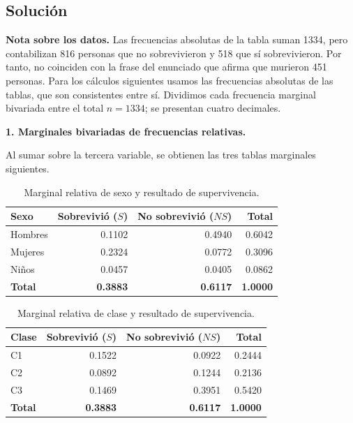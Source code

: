 \documentclass[12pt]{article}
\begin{document}
\subsection*{Solución}

\textbf{Nota sobre los datos.} Las frecuencias absolutas de la tabla suman 1334, pero contabilizan 816 personas que no sobrevivieron y 518 que sí sobrevivieron. Por tanto, no coinciden con la frase del enunciado que afirma que murieron 451 personas. Para los cálculos siguientes usamos las frecuencias absolutas de las tablas, que son consistentes entre sí. Dividimos cada frecuencia marginal bivariada entre el total $n=1334$; se presentan cuatro decimales.

\textbf{1. Marginales bivariadas de frecuencias relativas.}

Al sumar sobre la tercera variable, se obtienen las tres tablas marginales siguientes.

\begin{table}[H]
\centering
\small
\renewcommand{\arraystretch}{1.15}
\begin{tabular}{|l|r|r|r|}
\hline
\textbf{Sexo} & \textbf{Sobrevivió ($S$)} & \textbf{No sobrevivió ($NS$)} & \textbf{Total} \\ \hline
Hombres & 0.1102 & 0.4940 & 0.6042 \\ \hline
Mujeres & 0.2324 & 0.0772 & 0.3096 \\ \hline
Niños & 0.0457 & 0.0405 & 0.0862 \\ \hline
\textbf{Total} & \textbf{0.3883} & \textbf{0.6117} & \textbf{1.0000} \\ \hline
\end{tabular}
\caption{Marginal relativa de sexo y resultado de supervivencia.}
\label{tab:titanic-marginal-sexo-supervivencia}
\end{table}

\begin{table}[H]
\centering
\small
\renewcommand{\arraystretch}{1.15}
\begin{tabular}{|l|r|r|r|}
\hline
\textbf{Clase} & \textbf{Sobrevivió ($S$)} & \textbf{No sobrevivió ($NS$)} & \textbf{Total} \\ \hline
C1 & 0.1522 & 0.0922 & 0.2444 \\ \hline
C2 & 0.0892 & 0.1244 & 0.2136 \\ \hline
C3 & 0.1469 & 0.3951 & 0.5420 \\ \hline
\textbf{Total} & \textbf{0.3883} & \textbf{0.6117} & \textbf{1.0000} \\ \hline
\end{tabular}
\caption{Marginal relativa de clase y resultado de supervivencia.}
\label{tab:titanic-marginal-clase-supervivencia}
\end{table}
\end{document}
